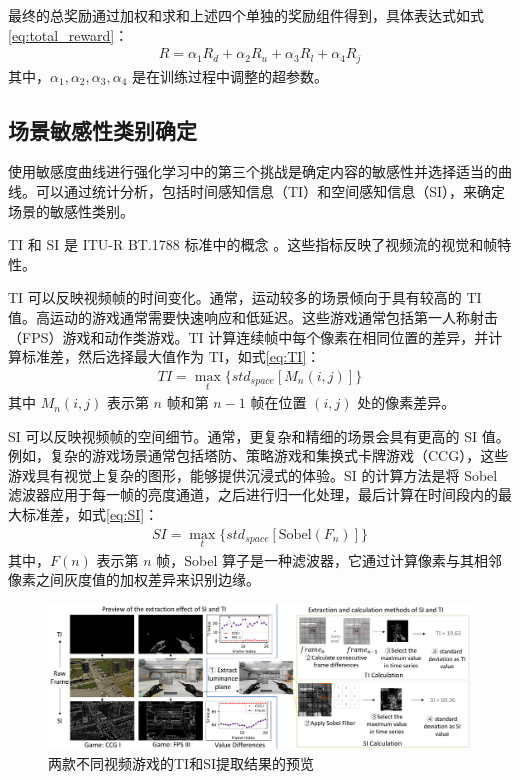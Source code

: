 最终的总奖励通过加权和求和上述四个单独的奖励组件得到，具体表达式如式\eqref{eq:total_reward}：
\begin{equation}
\begin{aligned}
R = \alpha_1 R_d + \alpha_2 R_u + \alpha_3 R_l + \alpha_4 R_j
\end{aligned}
\label{eq:total_reward}
\end{equation}
其中，$\alpha_1, \alpha_2, \alpha_3, \alpha_4$ 是在训练过程中调整的超参数。

\subsection{场景敏感性类别确定} \label{sec-cat}
使用敏感度曲线进行强化学习中的第三个挑战是确定内容的敏感性并选择适当的曲线。可以通过统计分析，包括时间感知信息（TI）和空间感知信息（SI），来确定场景的敏感性类别。

TI 和 SI 是 ITU-R BT.1788 标准中的概念 \cite{yang2014comparison}。这些指标反映了视频流的视觉和帧特性。



TI 可以反映视频帧的时间变化。通常，运动较多的场景倾向于具有较高的 TI 值。高运动的游戏通常需要快速响应和低延迟。这些游戏通常包括第一人称射击（FPS）游戏和动作类游戏。TI 计算连续帧中每个像素在相同位置的差异，并计算标准差，然后选择最大值作为 TI，如式\eqref{eq:TI}：
\begin{equation}
\begin{aligned}
TI = \max_{t}\{std_{space}[M_n(i,j)]\}
\end{aligned}
\label{eq:TI}
\end{equation}
其中 $M_n(i,j)$ 表示第 $n$ 帧和第 $n-1$ 帧在位置 $(i,j)$ 处的像素差异。

SI 可以反映视频帧的空间细节。通常，更复杂和精细的场景会具有更高的 SI 值。例如，复杂的游戏场景通常包括塔防、策略游戏和集换式卡牌游戏（CCG），这些游戏具有视觉上复杂的图形，能够提供沉浸式的体验。SI 的计算方法是将 Sobel 滤波器应用于每一帧的亮度通道，之后进行归一化处理，最后计算在时间段内的最大标准差，如式\eqref{eq:SI}：
\begin{equation}
\begin{aligned}
SI= \max_{t}\{std_{space}[\mathrm{Sobel}(F_n)]\}
\end{aligned}
\label{eq:SI}
\end{equation}
其中，$F(n)$ 表示第 $n$ 帧，Sobel 算子是一种滤波器，它通过计算像素与其相邻像素之间灰度值的加权差异来识别边缘。

\begin{figure} [ht]
\centering
\includegraphics[width=\textwidth]{figures/chap03/intra_schematic_diagram.pdf} 
\caption{两款不同视频游戏的TI和SI提取结果的预览}
\label{fig_intra_schematic_diagram}
\end{figure}

